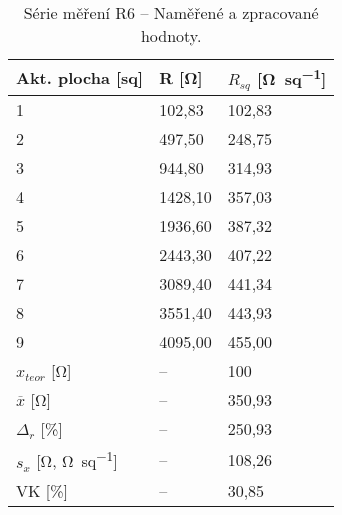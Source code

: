 \begin{table}[h!]
    \caption{Série měření R6 -- Naměřené a zpracované hodnoty.}
    \centering
    \def\arraystretch{1.4}
    \begin{tabular}{l|l|l}
        Akt. plocha [sq]                              & R [\unit{\ohm}]    & \(R_{sq}\) [\unit{\ohm\per sq}]  \\ \hline\hline
        1                                             & 102,83   & 102,83 \\ \hline
        2                                             & 497,50   & 248,75 \\ \hline
        3                                             & 944,80   & 314,93 \\ \hline
        4                                             & 1428,10  & 357,03 \\ \hline
        5                                             & 1936,60  & 387,32 \\ \hline
        6                                             & 2443,30  & 407,22 \\ \hline
        7                                             & 3089,40  & 441,34 \\ \hline
        8                                             & 3551,40  & 443,93 \\ \hline
        9                                             & 4095,00  & 455,00 \\ \hline\hline
        \(x_{teor} \) [\unit{\ohm}]                   & --       & 100    \\ \hline
        \(\overline{x} \) [\unit{\ohm}]               & --       & 350,93 \\ \hline
        \(\Delta_{r} \) [\unit{\percent}]             & --       & 250,93\\ \hline\hline
        \(s_{x} \) [\unit{\ohm}, \unit{\ohm\per sq}]  & --       & 108,26   \\ \hline
        VK [\unit{\percent}]                          & --       & 30,85 \\ 
    \end{tabular}
    \label{tab:r6_hodnoty}
\end{table}